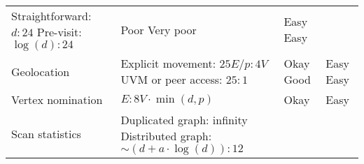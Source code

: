 \documentclass[10pt,oneside]{memoir}
\begin{document}
\begin{longtable}[]{@{}llll@{}}
\begin{minipage}[t]{0.37\columnwidth}
Straightforward: \(d : 24\) \linebreak Pre-visit: \(\log(d) : 24\)\strut
\end{minipage} & \begin{minipage}[t]{0.12\columnwidth}\raggedright
Poor \linebreak Very poor\strut
\end{minipage} & \begin{minipage}[t]{0.14\columnwidth}\raggedright
Easy \linebreak Easy\strut
\end{minipage}\tabularnewline
\begin{minipage}[t]{0.25\columnwidth}\raggedright
Geolocation\strut
\end{minipage} & \begin{minipage}[t]{0.37\columnwidth}\raggedright
Explicit movement: \(25E/p : 4V\) \linebreak UVM or peer access:
\(25 : 1\)\strut
\end{minipage} & \begin{minipage}[t]{0.12\columnwidth}\raggedright
Okay \linebreak Good\strut
\end{minipage} & \begin{minipage}[t]{0.14\columnwidth}\raggedright
Easy \linebreak Easy\strut
\end{minipage}\tabularnewline
\begin{minipage}[t]{0.25\columnwidth}\raggedright
Vertex nomination\strut
\end{minipage} & \begin{minipage}[t]{0.37\columnwidth}\raggedright
\(E : 8V \cdot \min(d, p)\)\strut
\end{minipage} & \begin{minipage}[t]{0.12\columnwidth}\raggedright
Okay\strut
\end{minipage} & \begin{minipage}[t]{0.14\columnwidth}\raggedright
Easy\strut
\end{minipage}\tabularnewline
\begin{minipage}[t]{0.25\columnwidth}\raggedright
Scan statistics\strut
\end{minipage} & \begin{minipage}[t]{0.37\columnwidth}\raggedright
Duplicated graph: infinity \linebreak Distributed graph:
\(\sim (d+a \cdot \log(d)):12\)\strut
\end{minipage} & \begin{minipage}[t]{0.12\columnwidth}\raggedright

\end{minipage}
\end{longtable}
\end{document}

